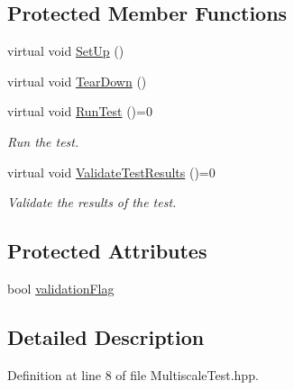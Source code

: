 \subsection*{\-Protected \-Member \-Functions}
\begin{DoxyCompactItemize}
\item 
virtual void \hyperlink{classmultiscaletest_1_1MultiscaleTest_ae2aca36167fd45b7ad41a62959fa2d7b}{\-Set\-Up} ()
\item 
virtual void \hyperlink{classmultiscaletest_1_1MultiscaleTest_a189153640670abf1819ae8d71899aa94}{\-Tear\-Down} ()
\item 
virtual void \hyperlink{classmultiscaletest_1_1MultiscaleTest_a3b3c62b74e1fd1eb0633f9b720659ce3}{\-Run\-Test} ()=0
\begin{DoxyCompactList}\small\item\em \-Run the test. \end{DoxyCompactList}\item 
virtual void \hyperlink{classmultiscaletest_1_1MultiscaleTest_a571838b9aa291a62da67733e39268871}{\-Validate\-Test\-Results} ()=0
\begin{DoxyCompactList}\small\item\em \-Validate the results of the test. \end{DoxyCompactList}\end{DoxyCompactItemize}
\subsection*{\-Protected \-Attributes}
\begin{DoxyCompactItemize}
\item 
bool \hyperlink{classmultiscaletest_1_1MultiscaleTest_a0a15b3e8510007c85ca5af092c248c9c}{validation\-Flag}
\end{DoxyCompactItemize}


\subsection{\-Detailed \-Description}


\-Definition at line 8 of file \-Multiscale\-Test.\-hpp.



